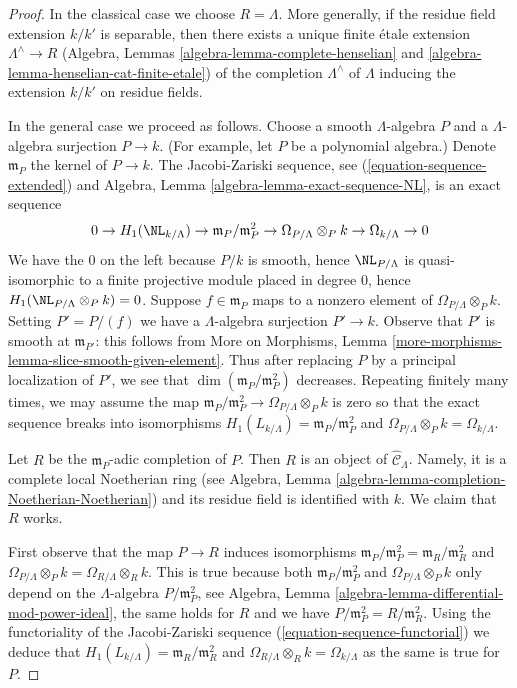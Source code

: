 \begin{proof}
In the classical case we choose $R = \Lambda$. More generally, if
the residue field extension $k/k'$ is separable, then there exists
a unique finite \'etale extension $\Lambda^\wedge \to R$
(Algebra, Lemmas \ref{algebra-lemma-complete-henselian} and
\ref{algebra-lemma-henselian-cat-finite-etale})
of the completion $\Lambda^\wedge$ of $\Lambda$
inducing the extension $k/k'$ on residue fields.

\medskip\noindent
In the general case we proceed as follows. Choose a smooth
$\Lambda$-algebra $P$ and a $\Lambda$-algebra surjection $P \to k$.
(For example, let $P$ be a polynomial algebra.)
Denote $\mathfrak m_P$ the kernel of $P \to k$. The Jacobi-Zariski sequence,
see (\ref{equation-sequence-extended}) and
Algebra, Lemma \ref{algebra-lemma-exact-sequence-NL}, is an
exact sequence
$$
0 \to H_1(\NL_{k/\Lambda}) \to
\mathfrak m_P/\mathfrak m_P^2 \to
\Omega_{P/\Lambda} \otimes_P k \to
\Omega_{k/\Lambda} \to 0
$$
We have the $0$ on the left because $P/k$ is smooth, hence
$\NL_{P/\Lambda}$ is quasi-isomorphic to a finite projective module
placed in degree $0$, hence $H_1(\NL_{P/\Lambda} \otimes_P k) = 0$.
Suppose $f \in \mathfrak m_P$ maps to a nonzero element
of $\Omega_{P/\Lambda} \otimes_P k$. Setting $P' = P/(f)$ we have a
$\Lambda$-algebra surjection $P' \to k$.
Observe that $P'$ is smooth at $\mathfrak m_{P'}$:
this follows from More on Morphisms, Lemma
\ref{more-morphisms-lemma-slice-smooth-given-element}.
Thus after replacing $P$ by a principal localization
of $P'$, we see that $\dim(\mathfrak m_P/\mathfrak m_P^2)$
decreases. Repeating finitely many times, we may assume
the map $\mathfrak m_P/\mathfrak m_P^2 \to
\Omega_{P/\Lambda} \otimes_P k$ is zero so that
the exact sequence breaks into isomorphisms
$H_1(L_{k/\Lambda}) = \mathfrak m_P/\mathfrak m_P^2$ and
$\Omega_{P/\Lambda} \otimes_P k = \Omega_{k/\Lambda}$.

\medskip\noindent
Let $R$ be the $\mathfrak m_P$-adic completion of $P$.
Then $R$ is an object of $\widehat{\mathcal{C}}_\Lambda$.
Namely, it is a complete local Noetherian ring (see
Algebra, Lemma \ref{algebra-lemma-completion-Noetherian-Noetherian})
and its residue field is identified with $k$.
We claim that $R$ works.

\medskip\noindent
First observe that the map $P \to R$ induces isomorphisms
$\mathfrak m_P/\mathfrak m_P^2 = \mathfrak m_R/\mathfrak m_R^2$
and $\Omega_{P/\Lambda} \otimes_P k = \Omega_{R/\Lambda} \otimes_R k$.
This is true because both $\mathfrak m_P/\mathfrak m_P^2$
and $\Omega_{P/\Lambda} \otimes_P k$ only depend on the
$\Lambda$-algebra $P/\mathfrak m_P^2$, see
Algebra, Lemma \ref{algebra-lemma-differential-mod-power-ideal},
the same holds for $R$ and we have $P/\mathfrak m_P^2 = R/\mathfrak m_R^2$.
Using the functoriality of the Jacobi-Zariski sequence
(\ref{equation-sequence-functorial})
we deduce that $H_1(L_{k/\Lambda}) = \mathfrak m_R/\mathfrak m_R^2$ and
$\Omega_{R/\Lambda} \otimes_R k = \Omega_{k/\Lambda}$
as the same is true for $P$.


\end{proof}
